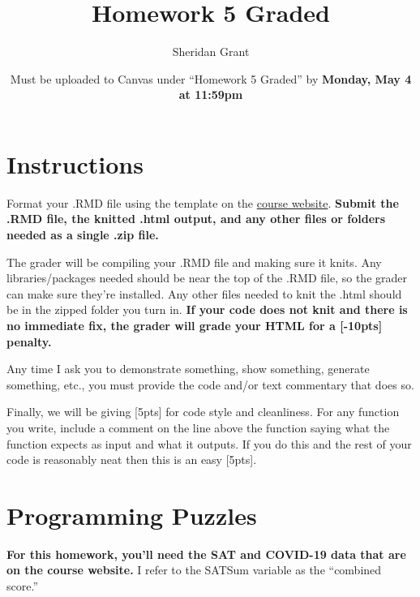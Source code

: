 \documentclass[12pt]{article}
\title{Homework 5 Graded}
\author{Sheridan Grant}
\date{Must be uploaded to Canvas under ``Homework 5 Graded'' by \textbf{Monday, May 4 at 11:59pm}}
\begin{document}
\sloppy

\maketitle

\section*{Instructions}

Format your .RMD file using the template on the \href{https://sheridanlgrant.github.io/teaching/STAT302_SPR2020}{course website}. \textbf{Submit the .RMD file, the knitted .html output, and any other files or folders needed as a single .zip file.}

The grader will be compiling your .RMD file and making sure it knits. Any libraries/packages needed should be near the top of the .RMD file, so the grader can make sure they're installed. Any other files needed to knit the .html should be in the zipped folder you turn in. \textbf{If your code does not knit and there is no immediate fix, the grader will grade your HTML for a [-10pts] penalty.}

Any time I ask you to demonstrate something, show something, generate something, etc., you must provide the code and/or text commentary that does so.

Finally, we will be giving [5pts] for code style and cleanliness. For any function you write, include a comment on the line above the function saying what the function expects as input and what it outputs. If you do this and the rest of your code is reasonably neat then this is an easy [5pts].

\section{Programming Puzzles}

\textbf{For this homework, you'll need the SAT and COVID-19 data that are on the course website.} I refer to the SATSum variable as the ``combined score.''
\end{document}
